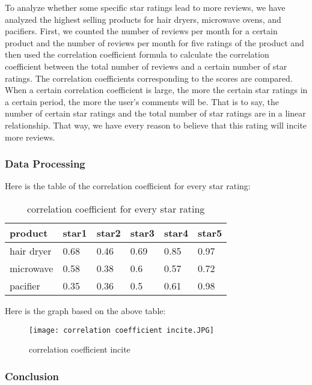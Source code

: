 \documentclass{mcmthesis}
\begin{document}
To analyze whether some specific star ratings lead to more reviews, we have analyzed the highest selling products for hair dryers, microwave ovens, and pacifiers. First, we counted the number of reviews per month for a certain product and the number of reviews per month for five ratings of the product and then used the correlation coefficient formula to calculate the correlation coefficient between the total number of reviews and a certain number of star ratings. The correlation coefficients corresponding to the scores are compared. When a certain correlation coefficient is large, the more the certain star ratings in a certain period, the more the user's comments will be. That is to say, the number of certain star ratings and the total number of star ratings are in a linear relationship. That way, we have every reason to believe that this rating will incite more reviews.

\subsubsection{Data Processing}

Here is the table of the correlation coefficient for every star rating:

\begin{table}[H]
	\centering
	\caption{correlation coefficient for every star rating}
	\resizebox{\textwidth}{!}
	{%
		\begin{tabular}{|l|l|l|l|l|l|}
			\hline
			product    & star1 & star2 & star3 & star4 & star5 \\ \hline
			hair dryer & 0.68  & 0.46  & 0.69  & 0.85  & 0.97  \\ \hline
			microwave  & 0.58  & 0.38  & 0.6   & 0.57  & 0.72  \\ \hline
			pacifier   & 0.35  & 0.36  & 0.5   & 0.61  & 0.98  \\ \hline
		\end{tabular}%
	}
\end{table}

Here is the graph based on the above table:

\begin{figure}[H]
	\small
	\centering
	\texttt{[image: correlation coefficient incite.JPG]}
	\caption{correlation coefficient incite} \label{fig:correlation coefficient incite}
\end{figure}

\subsubsection{Conclusion}
\end{document}
